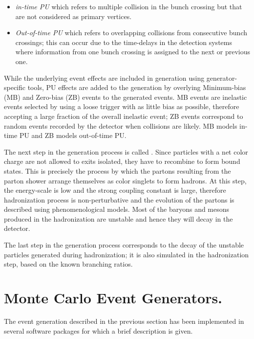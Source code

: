 \begin{itemize}
\item \textit{in-time PU} which refers to multiple \pp collision in the bunch crossing but that are not considered as primary vertices. 
\item \textit{Out-of-time PU} which refers to overlapping \pp collisions from consecutive bunch crossings; this can occur due to the time-delays in the detection systems where information from one bunch crossing is assigned to the next or previous one. 
\end{itemize}

While the underlying event effects are included in generation using generator-specific tools, PU effects are added to the generation by overlying Minimum-bias (MB) and Zero-bias (ZB) events to the generated events. MB events are inelastic events selected by using a loose trigger with as little bias as possible, therefore accepting a large fraction of the overall inelastic event; ZB events correspond to random events recorded by the detector when collisions are likely. MB models in-time PU and ZB models out-of-time PU. 

The next step in the generation process is called . Since particles with a net color charge are not allowed to exits isolated, they have to recombine to form bound states. This is precisely the process by which the partons resulting from the parton shower arrange themselves as color singlets to form hadrons. At this step, the energy-scale is low and the strong coupling constant is large, therefore hadronization process is non-perturbative and the evolution of the partons is described using phenomenological models. Most of the baryons and mesons produced in the hadronization are unstable and hence they will decay in the detector.

The last step in the generation process corresponds to the decay of the unstable particles generated during hadronization; it is also simulated in the hadronization step, based on the known branching ratios. 

\section{Monte Carlo Event Generators.}

The event generation described in the previous section has been implemented in several software packages for which a brief description is given.     

